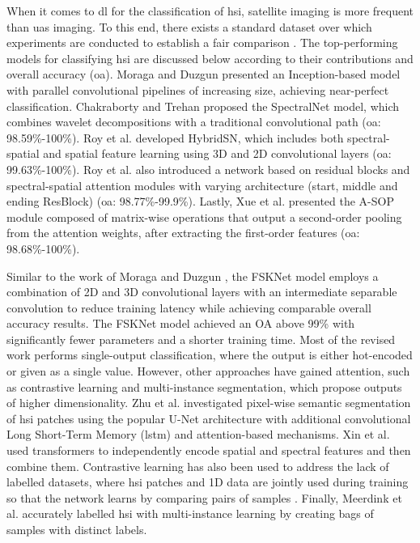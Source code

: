 When it comes to \acrshort{dl} for the classification of \acrshort{hsi}, satellite imaging is more frequent than \acrshort{uas} imaging. To this end, there exists a standard dataset over which experiments are conducted to establish a fair comparison \cite{m_grana_hyperspectral_nodate}. The top-performing models for classifying \acrshort{hsi} are discussed below according to their contributions and overall accuracy (\acrshort{oa}). Moraga and Duzgun \cite{moraga_jigsawhsi_2022} presented an Inception-based model with parallel convolutional pipelines of increasing size, achieving near-perfect classification. Chakraborty and Trehan \cite{chakraborty_spectralnet_2021} proposed the SpectralNet model, which combines wavelet decompositions with a traditional convolutional path (\acrshort{oa}: 98.59\%-100\%). Roy et al. \cite{roy_hybridsn_2020} developed HybridSN, which includes both spectral-spatial and spatial feature learning using 3D and 2D convolutional layers (\acrshort{oa}: 99.63\%-100\%). Roy et al. \cite{roy_attention-based_2021} also introduced a network based on residual blocks and spectral-spatial attention modules with varying architecture (start, middle and ending ResBlock) (\acrshort{oa}: 98.77\%-99.9\%). Lastly, Xue et al. \cite{xue_attention-based_2021} presented the A-SOP module composed of matrix-wise operations that output a second-order pooling from the attention weights, after extracting the first-order features (\acrshort{oa}: 98.68\%-100\%). 

Similar to the work of Moraga and Duzgun \cite{moraga_jigsawhsi_2022}, the FSKNet model employs a combination of 2D and 3D convolutional layers with an intermediate separable convolution to reduce training latency while achieving comparable overall accuracy results. The FSKNet model achieved an OA above 99\% with significantly fewer parameters and a shorter training time. Most of the revised work performs single-output classification, where the output is either hot-encoded or given as a single value. However, other approaches have gained attention, such as contrastive learning and multi-instance segmentation, which propose outputs of higher dimensionality. Zhu et al. \cite{zhu_spectral-spatial-dependent_2021} investigated pixel-wise semantic segmentation of \acrshort{hsi} patches using the popular U-Net architecture with additional convolutional Long Short-Term Memory (\acrshort{lstm}) and attention-based mechanisms. Xin et al. \cite{xin_convolution_2022} used transformers to independently encode spatial and spectral features and then combine them. Contrastive learning has also been used to address the lack of labelled datasets, where \acrshort{hsi} patches and 1D data are jointly used during training so that the network learns by comparing pairs of samples \cite{guan_spatial-spectral_2022}. Finally, Meerdink et al. \cite{meerdink_multitarget_2022} accurately labelled \acrshort{hsi} with multi-instance learning by creating bags of samples with distinct labels.

